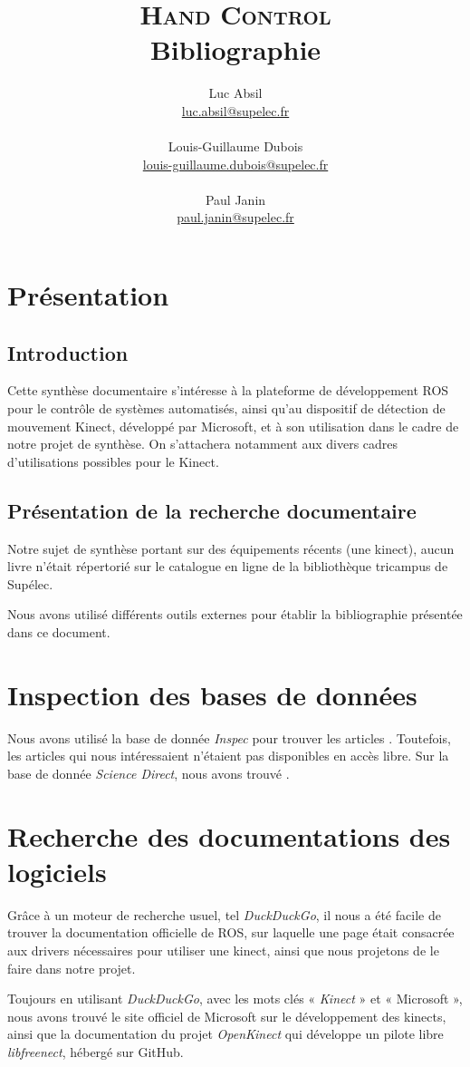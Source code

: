 \documentclass[fontsize=12pt, DIV=calc, a4paper]{scrartcl}
\title{\textsc{Hand Control}\\
 \textbf{Bibliographie}}
\author{Luc Absil\\
\href{mailto:luc.absil@supelec.fr}{luc.absil@supelec.fr}\\
~\\
 Louis-Guillaume Dubois\\
 \href{mailto:louis-guillaume.dubois@supelec.fr}{louis-guillaume.dubois@supelec.fr}\\
 ~\\
Paul Janin\\
\href{mailto:paul.janin@supelec.fr}{paul.janin@supelec.fr}
}
\date{}
\begin{document}
\maketitle

\tableofcontents

\section{Présentation}
\subsection{Introduction}
Cette synthèse documentaire s'intéresse à la plateforme de développement ROS pour le contrôle de systèmes automatisés, ainsi qu'au dispositif de détection de mouvement Kinect, développé par Microsoft, et à son utilisation dans le cadre de notre projet de synthèse. On s'attachera notamment aux divers cadres d'utilisations possibles pour le Kinect.

\subsection{Présentation de la recherche documentaire}
Notre sujet de synthèse portant sur des équipements récents (une kinect), aucun livre n'était répertorié sur le catalogue en ligne de la bibliothèque tricampus de Supélec. 

Nous avons utilisé différents outils externes pour établir la bibliographie présentée dans ce document.

\section{Inspection des bases de données}
Nous avons utilisé la base de donnée \emph{Inspec} pour trouver les articles \cite{performance} \cite{Kinect-3D} \cite{Kinect-robotic}. Toutefois, les articles qui nous intéressaient n'étaient pas disponibles en accès libre. Sur la base de donnée \emph{Science Direct}, nous avons trouvé \cite{Alisher}.

\section{Recherche des documentations des logiciels}
Grâce à un moteur de recherche usuel, tel \emph{DuckDuckGo}, il nous a été facile de trouver la documentation officielle de ROS\cite{Tutoriels}, sur laquelle une page était consacrée aux drivers nécessaires\cite{ROS} pour utiliser une kinect, ainsi que nous projetons de le faire dans notre projet.

Toujours en utilisant \emph{DuckDuckGo}, avec les mots clés « \emph{Kinect} » et « Microsoft », nous avons trouvé le site officiel de Microsoft sur le développement des kinects\cite{Kinectwindows}, ainsi que la documentation du projet \emph{OpenKinect} qui développe un pilote libre \emph{libfreenect}\cite{OpenKinect}, hébergé sur GitHub.


 
\end{document}

